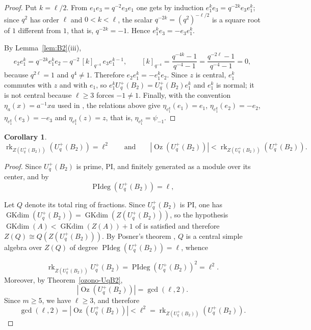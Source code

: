 \documentclass[11pt]{article}
\newtheorem{corollary}[theorem]{Corollary}
\theoremstyle{definition}
\DeclareMathOperator{\GKdim}{GKdim}
\begin{document}
\begin{proof}
Put \(k=\ell/2\). From \(e_1e_3=q^{-2}e_3e_1\) one gets by induction
\(e_1^{k}e_3=q^{-2k}e_3e_1^{k}\); since \(q^{2}\) has order \(\ell\) and
\(0<k<\ell\), the scalar \(q^{-2k}=(q^{2})^{-\ell/2}\) is a square root of
\(1\) different from \(1\), that is, \(q^{-2k}=-1\). Hence
\(e_1^{k}e_3=-e_3e_1^{k}\).

By Lemma~\ref{lem:B2}(iii),
\[
e_2 e_1^{k}=q^{-2k} e_1^{k} e_2-q^{-2}\,[k]_{q^{-4}}\, e_3 e_1^{k-1},
\qquad
[k]_{q^{-4}}=\frac{q^{-4k}-1}{q^{-4}-1}=\frac{q^{-2\ell}-1}{q^{-4}-1}=0,
\]
because \(q^{2\ell}=1\) and \(q^{4}\neq1\). Therefore
\(e_2e_1^{k}=-e_1^{k}e_2\). Since \(z\) is central, \(e_1^{k}\) commutes with
\(z\) and with \(e_1\), so \(e_1^{k}U_q^{+}(B_2)=U_q^{+}(B_2)e_1^{k}\) and
\(e_1^{k}\) is normal; it is not central because \(\ell\geq3\) forces
\(-1\neq1\). Finally, with the convention
\(\eta_a(x)=a^{-1}xa\) used in \cite[Lemma~1.10]{ChanGaddisWonZhang2025}, the
relations above give \(\eta_{e_1^{k}}(e_1)=e_1\),
\(\eta_{e_1^{k}}(e_2)=-e_2\), \(\eta_{e_1^{k}}(e_3)=-e_3\) and
\(\eta_{e_1^{k}}(z)=z\), that is, \(\eta_{e_1^{k}}=\psi_{-1}\).
\end{proof}




\begin{corollary}
\label{cor:rango-ozono-UqB2}
$$
\operatorname{rk}_{Z(U_q^{+}(B_2))}(U_q^{+}(B_2))=\ell^2
\qquad\text{and}\qquad
|\operatorname{Oz}(U_q^{+}(B_2))|
<
\operatorname{rk}_{Z(U_q^{+}(B_2))}(U_q^{+}(B_2)).
$$
\end{corollary}





\begin{proof}
Since \(U_q^{+}(B_2)\) is prime, PI, and finitely generated as a module over its center, and by \cite[Theorem~2.7]{BeraMukherjee2026UqB2}
$$
\operatorname{PIdeg}(U_q^{+}(B_2))=\ell,
$$

 Let
\(Q\) denote its total ring of fractions. Since \(U_q^{+}(B_2)\) is PI, one has
\(\GKdim(U_q^{+}(B_2))=\GKdim(Z(U_q^{+}(B_2)))\), so the hypothesis
\(\GKdim(A)<\GKdim(Z(A))+1\) of \cite[Theorem~2.1]{LezamaVenegas2020Serdica} is
satisfied and therefore \(Z(Q)\cong Q(Z(U_q^{+}(B_2)))\). By Posner's theorem
\cite[Theorem~13.6.5]{mcconnell}, \(Q\) is a central simple algebra over
\(Z(Q)\) of degree \(\operatorname{PIdeg}(U_q^{+}(B_2))=\ell\), whence

$$
\operatorname{rk}_{Z(U_q^{+}(B_2))}U_q^{+}(B_2) = \operatorname{PIdeg}(U_q^{+}(B_2))^2 = \ell^2.
$$
Moreover, by Theorem~\ref{ozono-UqB2},
$$
|\operatorname{Oz}(U_q^{+}(B_2))|
=
\gcd(\ell,2).
$$
Since \(m\geq5\), we have \(\ell\geq3\), and therefore
$$
\gcd(\ell,2)
=
|\operatorname{Oz}(U_q^{+}(B_2))|
<
\ell^2
=
\operatorname{rk}_{Z(U_q^{+}(B_2))}(U_q^{+}(B_2)).
$$
\end{proof}
\end{document}
